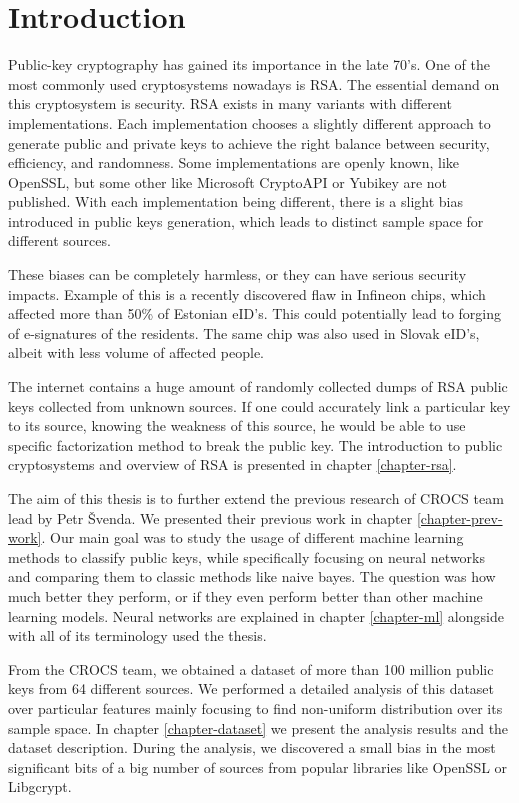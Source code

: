 \chapter*{Introduction}

Public-key cryptography has gained its importance in the late 70's. One of the most commonly used cryptosystems nowadays is RSA. The essential demand on this cryptosystem is security. RSA exists in many variants with different implementations. Each implementation chooses a slightly different approach to generate public and private keys to achieve the right balance between security, efficiency, and randomness. Some implementations are openly known, like OpenSSL, but some other like Microsoft CryptoAPI or Yubikey are not published. With each implementation being different, there is a slight bias introduced in public keys generation, which leads to distinct sample space for different sources. 

These biases can be completely harmless, or they can have serious security impacts. Example of this is a recently discovered flaw in Infineon chips\cite{svenda_2}, which affected more than 50\% of Estonian eID's. This could potentially lead to forging of e-signatures of the residents. The same chip was also used in Slovak eID's, albeit with less volume of affected people.

The internet contains a huge amount of randomly collected dumps of RSA public keys collected from unknown sources. If one could accurately link a particular key to its source, knowing the weakness of this source, he would be able to use specific factorization method to break the public key. The introduction to public cryptosystems and overview of RSA is presented in chapter \ref{chapter-rsa}.

The aim of this thesis is to further extend the previous research of CROCS team \cite{svenda_1}\cite{svenda_3} lead by Petr Švenda. We presented their previous work in chapter \ref{chapter-prev-work}. Our main goal was to study the usage of different machine learning methods to classify public keys, while specifically focusing on neural networks and comparing them to classic methods like naive bayes. The question was how much better they perform, or if they even perform better than other machine learning models. Neural networks are explained in chapter \ref{chapter-ml} alongside with all of its terminology used the thesis.

From the CROCS team, we obtained a dataset of more than 100 million public keys from 64 different sources. We performed a detailed analysis of this dataset over particular features mainly focusing to find non-uniform distribution over its sample space. In chapter \ref{chapter-dataset} we present the analysis results and the dataset description. During the analysis, we discovered a small bias in the most significant bits of a big number of sources from popular libraries like OpenSSL or Libgcrypt.

